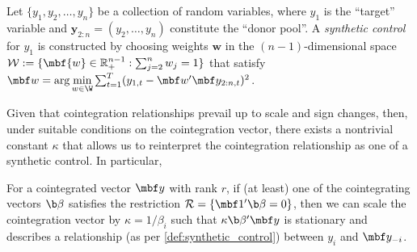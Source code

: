 
\begin{definition}\label{def:synthetic_control}
Let $\{y_1, y_2, \dots, y_n\}$ be a collection of random variables, where $y_1$ is the ``target'' variable and 
$\mathbf{y}_{2:n} = (y_2,\dots,y_n)$ constitute the ``donor pool''. A \emph{synthetic control} for
$y_1$ is constructed by choosing weights $\mathbf{w}$ in the $(n-1)$-dimensional space
$\mathcal{W} := \{\mbf{w}\in\mathbb{R}_{+}^{n-1}: \sum_{j=2}^n w_j=1\}$
that satisfy
$\mbf w=\arg\underset{w\in\W}{\min} 
\sum_{t=1}^T 
(y_{1,t}-\mbf w'\mbf y_{2:n,t})^2$.
\end{definition}


Given that cointegration relationships prevail up to scale and sign changes, then, under suitable conditions on the cointegration vector, there exists a nontrivial constant $\kappa$ that allows us to reinterpret the cointegration relationship as one of a synthetic control. In particular,
\begin{proposition} 
For a cointegrated vector $\mbf y$  with rank $r$, if (at least) one of the cointegrating vectors $\b \beta$ satisfies the restriction
$\mathcal R=
\{
\mbf 1' \b \beta  = 0
\}$,
 then we can scale the cointegration vector by $\kappa=1/\beta_i$ such that $\kappa \b \beta ' \mbf y$ is stationary and describes a  relationship (as per \cref{def:synthetic_control}) between $y_i$ and $\mbf y_{-i}$. 
\end{proposition}

